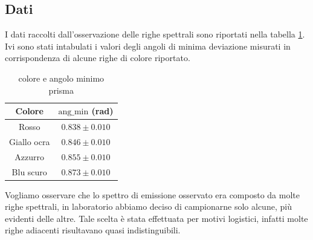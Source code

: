 \documentclass[a4paper]{article}
\begin{document}
\subsection{Dati}
I dati raccolti dall'osservazione delle righe spettrali sono riportati nella tabella \ref{tab:Angoli_gas_ignoto_prisma}. Ivi sono stati intabulati i valori degli angoli di minima deviazione misurati in corrispondenza di alcune righe di colore riportato. 
\begin{table}[h!]
\centering
\begin{tabular}{|c|c|}
\hline
\textbf{Colore} & \textbf{$\text{ang\_min}$ (rad)} \\
\hline
Rosso   & $0.838 \pm 0.010$\\
Giallo ocra & $0.846 \pm 0.010$\\
Azzurro          & $0.855 \pm 0.010$\\
Blu scuro        & $0.873 \pm 0.010$\\
\hline
\end{tabular}
\caption{colore e angolo minimo prisma}
\label{tab:Angoli_gas_ignoto_prisma}
\end{table}
Vogliamo osservare che lo spettro di emissione osservato era composto da molte righe spettrali, in laboratorio abbiamo deciso di campionarne solo alcune, più evidenti delle altre. Tale scelta è stata effettuata per motivi logistici, infatti molte righe adiacenti risultavano quasi indistinguibili.   
\end{document}
